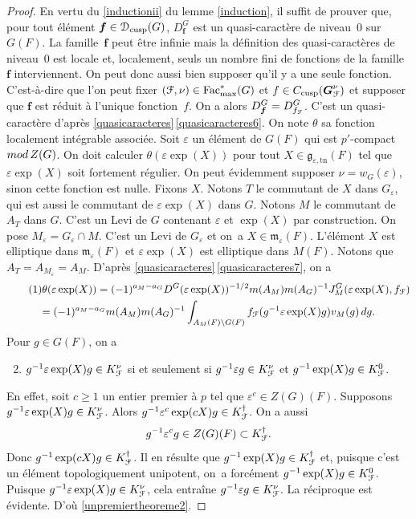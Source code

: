 \documentclass[11pt]{article}
\numberwithin{equation}{section}\providecommand{\og}{«\,}\providecommand{\fg}{\,»}
\let\mathcal \EuScript
\let\epsilon\varepsilon
\newcommand{\rmod}{\textup{mod}\,}
\newcommand{\frg}{\mathfrak{g}}
\newcommand{\mfrm}{\mathfrak{m}}
\newcommand{\cusp}{\mathrm{cusp}}
\newcommand{\Fac}{\mathrm{Fac}}
\newcommand{\tn}{\mathrm{tn}}
\newcommand{\bmf}{\boldsymbol{f}}
\newcommand{\bG}{\boldsymbol{G}}
\newcommand{\cD}{\mathcal{D}}
\newcommand{\cF}{\mathcal{F}}
\theoremstyle{plain}
\theoremstyle{definition}
\begin{document}
\begin{proof}
En vertu du \eqref{inductionii} du lemme \ref{induction}, il suffit de prouver que, pour tout élément $\bmf\in \cD_{\cusp}(G)$, $D^G_{\bmf}$ est un quasi-caractère de niveau~$0$ sur $G(F)$. La famille~$\bmf$ peut être infinie mais la définition des quasi-caractères de niveau~$0$ est locale et, loca\-lement, seuls un nombre fini de fonctions de la famille $\bmf$ interviennent. On peut donc aussi bien supposer qu'il y a une seule fonction. C'est-à-dire que l'on peut fixer $(\cF,\nu)\in \Fac^*_{\max}(G)$ et $f\in C_{\cusp}(\bG_{\cF}^{\nu})$ et supposer que $\bmf$ est réduit à l'unique fonction~$f$. On a alors $D^G_{\bmf}=D^G_{f_{\cF}}$. C'est un quasi-caractère d'après \ref{quasicaracteres}\,\eqref{quasicaracteres6}. On note $\theta$ sa fonction localement intégrable associée. Soit $\epsilon$ un élément de $G(F)$ qui est $p'$-compact $\rmod Z(G)$. On doit calculer $\theta(\epsilon \exp(X))$ pour tout $X\in \frg_{\epsilon,\tn}(F)$ tel que $\epsilon \exp(X)$ soit fortement régulier. On peut évidemment supposer $\nu=w_{G}(\epsilon)$, sinon cette fonction est nulle. Fixons $X$. Notons $T$ le commutant de $X$ dans $G_{\epsilon}$, qui est aussi le commutant de $\epsilon \exp(X)$ dans $G$. Notons $M$ le commutant de $A_{T}$ dans $G$. C'est un Levi de $G$ contenant $\epsilon$ et $\exp(X)$ par construction. On pose $M_{\epsilon}=G_{\epsilon}\cap M$. C'est un Levi de $G_{\epsilon}$ et on~a $X\in \mfrm_{\epsilon}(F)$. L'élément $X$ est elliptique dans $\mfrm_{\epsilon}(F)$ et $\epsilon \exp(X)$ est elliptique dans $M(F)$. Notons que $A_{T}=A_{M_{\epsilon}}=A_{M}$. D'après \ref{quasicaracteres}\,\eqref{quasicaracteres7}, on a
\begin{multline}\tag{1}\label{unpremiertheoreme1}
\theta(\epsilon \exp(X))=(-1)^{a_{M}-a_{G}}D^G(\epsilon \exp(X))^{-1/2}m(A_{M})m(A_{G})^{-1}J^G_{M}(\epsilon \exp(X),f_{\cF})
\\
=(-1)^{a_{M}-a_{G}}m(A_{M})m(A_{G})^{-1} \int_{A_{M}(F)\backslash G(F)}f_{\cF}(g^{-1} \epsilon \exp(X)g)v_{M}(g)\, dg.
\end{multline}
Pour $g\in G(F)$, on a
\begin{enumerate}\setcounter{enumi}{1}
\item\label{unpremiertheoreme2}
$g^{-1}\epsilon \exp(X)g\in K_{\cF}^{\nu}$ si et seulement si $g^{-1}\epsilon g\in K_{\cF}^{\nu}$ et $g^{-1} \exp(X)g\in K_{\cF}^0$.
\end{enumerate}

En effet, soit $c\geq1$ un entier premier à $p$ tel que $\epsilon^c\in Z(G)(F)$. Supposons $g^{-1}\epsilon \exp(X)g\in K_{\cF}^{\nu}$. Alors $g^{-1} \epsilon^c\exp(cX)g\in K_{\cF}^{\dag}$. On a aussi
\[
g^{-1}\epsilon^cg\in Z(G)(F)\subset K_{\cF}^{\dag}.
\]
Donc $g^{-1}\exp(cX)g\in K_{\cF}^{\dag}$. Il en résulte que $g^{-1}\exp(X)g\in K_{\cF}^{\dag}$ et, puisque c'est un élément topologiquement unipotent, on~a forcément $g^{-1}\exp(X)g\in K_{\cF}^0$. Puisque $g^{-1}\epsilon \exp(X)g\in K_{\cF}^{\nu}$, cela entraîne $g^{-1}\epsilon g\in K_{\cF}^{\nu}$. La réciproque est évidente. D'où \eqref{unpremiertheoreme2}.


\end{proof}
\end{document}
